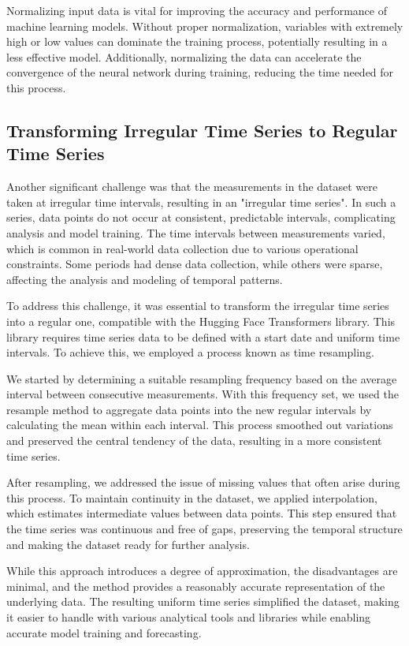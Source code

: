 Normalizing input data is vital for improving the accuracy and performance of machine learning models. Without proper normalization, variables with extremely high or low values can dominate the training process, potentially resulting in a less effective model. Additionally, normalizing the data can accelerate the convergence of the neural network during training, reducing the time needed for this process.

\subsection{Transforming Irregular Time Series to Regular Time Series}

Another significant challenge was that the measurements in the dataset were taken at irregular time intervals, resulting in an "irregular time series". In such a series, data points do not occur at consistent, predictable intervals, complicating analysis and model training. The time intervals between measurements varied, which is common in real-world data collection due to various operational constraints. Some periods had dense data collection, while others were sparse, affecting the analysis and modeling of temporal patterns.

To address this challenge, it was essential to transform the irregular time series into a regular one, compatible with the Hugging Face Transformers library. This library requires time series data to be defined with a start date and uniform time intervals. To achieve this, we employed a process known as time resampling.

We started by determining a suitable resampling frequency based on the average interval between consecutive measurements. With this frequency set, we used the resample method to aggregate data points into the new regular intervals by calculating the mean within each interval. This process smoothed out variations and preserved the central tendency of the data, resulting in a more consistent time series.

After resampling, we addressed the issue of missing values that often arise during this process. To maintain continuity in the dataset, we applied interpolation, which estimates intermediate values between data points. This step ensured that the time series was continuous and free of gaps, preserving the temporal structure and making the dataset ready for further analysis.

While this approach introduces a degree of approximation, the disadvantages are minimal, and the method provides a reasonably accurate representation of the underlying data. The resulting uniform time series simplified the dataset, making it easier to handle with various analytical tools and libraries while enabling accurate model training and forecasting.

